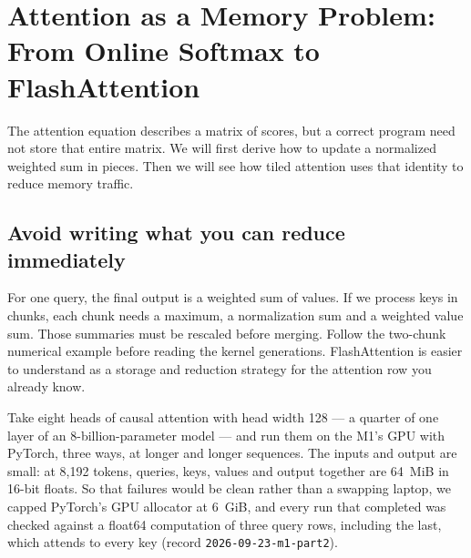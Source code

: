 \chapter{Attention as a Memory Problem: From Online Softmax to FlashAttention}\label{ch:flashattention}

\begin{ChapterIntent}
The attention equation describes a matrix of scores, but a correct program need not
store that entire matrix. We will first derive how to update a normalized weighted sum
in pieces. Then we will see how tiled attention uses that identity to reduce memory
traffic.
\end{ChapterIntent}

\section*{Avoid writing what you can reduce immediately}
For one query, the final output is a weighted sum of values. If we process keys in
chunks, each chunk needs a maximum, a normalization sum and a weighted value sum. Those
summaries must be rescaled before merging. Follow the two-chunk numerical example before
reading the kernel generations. FlashAttention is easier to understand as a storage and
reduction strategy for the attention row you already know.


Take eight heads of causal attention with head width 128 --- a quarter of
one layer of an 8-billion-parameter model --- and run them on the M1's GPU
with PyTorch, three ways, at longer and longer sequences. The inputs and output
are small: at 8,192 tokens, queries, keys, values and output together are
64~MiB in 16-bit floats. So that failures would be clean rather than a
swapping laptop, we capped PyTorch's GPU allocator at 6~GiB, and every run that
completed was checked against a float64 computation of three query rows,
including the last, which attends to every key (record
\texttt{2026-09-23-m1-part2}).

